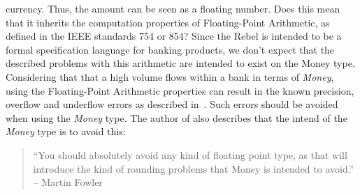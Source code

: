 currency. Thus, the amount can be seen as a floating number. Does this mean that
it inherits the computation properties of Floating-Point Arithmetic, as defined
in the IEEE standards 754 or 854? Since the Rebel is intended to be a formal
specification language for banking products, we don't expect that the described
problems with this arithmetic are intended to exist on the Money type.
Considering that that a high volume flows within a bank in terms of
\textit{Money}, using the Floating-Point Arithmetic properties can result in the
known precision, overflow and underflow errors as described
in~\cite{goldberg1991every}. Such errors should be avoided when using the
\textit{Money} type. The author of \cite{fowler2002patterns} also describes that
the intend of the \textit{Money} type is to avoid this:
\begin{quote}
	``You should absolutely avoid any kind of floating point type, as that will
	introduce the kind of rounding problems that Money is intended to avoid.''
    -- Martin Fowler \cite{fowler2002patterns}
\end{quote}

